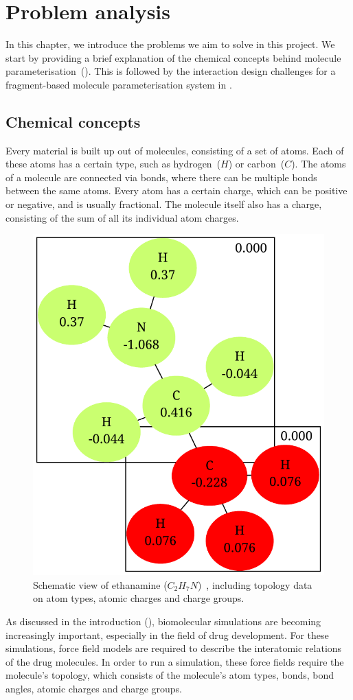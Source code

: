 \chapter{Problem analysis}

In this chapter, we introduce the problems we aim to solve in this project. We start by providing a brief explanation of the chemical concepts behind molecule parameterisation~(). This is followed by the interaction design challenges for a fragment-based molecule parameterisation system in .



\section{Chemical concepts}
Every material is built up out of molecules, consisting of a set of atoms. Each of these atoms has a certain type, such as hydrogen~($H$) or carbon~($C$). The atoms of a molecule are connected via bonds, where there can be multiple bonds between the same atoms. Every atom has a certain charge, which can be positive or negative, and is usually fractional. The molecule itself also has a charge, consisting of the sum of all its individual atom charges.

\begin{figure}
\vspace{-2em}
\begin{center}
\includegraphics[width=.38\textwidth]{img/ethanamine.pdf}
\caption{Schematic view of ethanamine ($C_{2}H_{7}N$)~\cite{atb2014ethanamine}, including topology data on atom types, atomic charges and charge groups.}
\end{center}
\vspace{-2em}
\end{figure}

As discussed in the introduction (), biomolecular simulations are becoming increasingly important, especially in the field of drug development. For these simulations, force field models are required to describe the interatomic relations of the drug molecules. In order to run a simulation, these force fields require the molecule's topology, which consists of the molecule's atom types, bonds, bond angles, atomic charges and charge groups.

